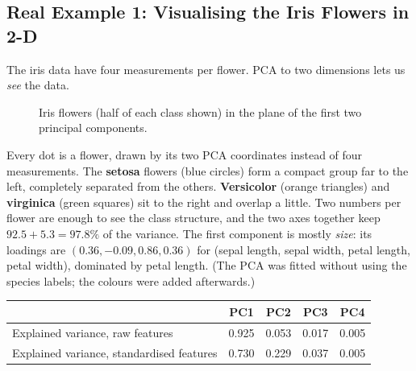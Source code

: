 \subsection{Real Example 1: Visualising the Iris Flowers in 2-D}

The iris data have four measurements per flower. PCA to two dimensions lets us \emph{see} the data.

\begin{figure}[!htbp]
\centering
{}
\caption{Iris flowers (half of each class shown) in the plane of the first two principal components.}\label{fig:irispca}
\end{figure}

\begin{explain}
Every dot is a flower, drawn by its two PCA coordinates instead of four measurements. The \textbf{setosa} flowers (blue circles) form a compact group far to the left, completely separated from the others. \textbf{Versicolor} (orange triangles) and \textbf{virginica} (green squares) sit to the right and overlap a little. Two numbers per flower are enough to see the class structure, and the two axes together keep $92.5+5.3=97.8\%$ of the variance. The first component is mostly \emph{size}: its loadings are $(0.36,-0.09,0.86,0.36)$ for (sepal length, sepal width, petal length, petal width), dominated by petal length. (The PCA was fitted without using the species labels; the colours were added afterwards.)
\end{explain}

\begin{center}
\begin{tabular}{@{}lcccc@{}}
\toprule
 & \textbf{PC1} & \textbf{PC2} & \textbf{PC3} & \textbf{PC4}\\
\midrule
Explained variance, raw features & 0.925 & 0.053 & 0.017 & 0.005\\
Explained variance, standardised features & 0.730 & 0.229 & 0.037 & 0.005\\
\bottomrule
\end{tabular}
\end{center}

